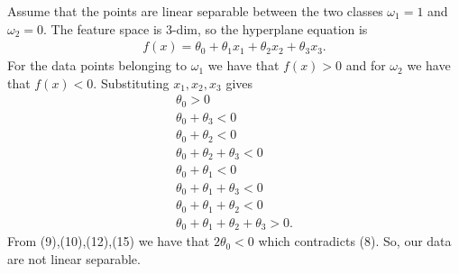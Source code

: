 \documentclass[12pt]{book}
\begin{document}
Assume that the points are linear separable between the two classes $\omega_1=1$ and $\omega_2=0$. The feature space is 3-dim, so the hyperplane equation is
\begin{align*}
f(x) = \theta_0 + \theta_1x_1 + \theta_2x_2 + \theta_3x_3.
\end{align*}
For the data points belonging to $\omega_1$ we have that $f(x)>0$ and for $\omega_2$ we have that $f(x)<0$. Substituting $x_1,x_2,x_3$ gives
\begin{align}
\theta_0>0 \\ \theta_0 + \theta_3<0 \\\theta_0 + \theta_2<0 \\ \theta_0 + \theta_2+\theta_3<0 \\\theta_0 + \theta_1<0 \\\theta_0 + \theta_1+\theta_3<0 \\ \theta_0 + \theta_1+\theta_2<0 \\ \theta_0+ \theta_1 + \theta_2 + \theta_3 >0.
\end{align}
From (9),(10),(12),(15) we have that $2\theta_0<0$ which contradicts (8). So, our data are not linear separable.
\end{document}
